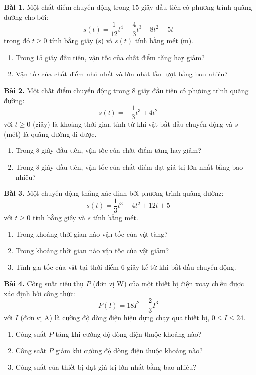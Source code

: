 \documentclass[12pt]{article}
\begin{document}
	\begin{btxanh}
		\textbf{Bài 1.} Một chất điểm chuyển động trong $15$ giây đầu tiên có phương trình quãng đường cho bởi:
		$$s(t) = \dfrac{1}{12}t^4 - \dfrac{4}{3}t^3 + 8t^2 + 5t$$
		trong đó $t \ge 0$ tính bằng giây ($\text{s}$) và $s(t)$ tính bằng mét ($\text{m}$).
		\begin{enumerate}[label=\alph*)]
			\item Trong $15$ giây đầu tiên, vận tốc của chất điểm tăng hay giảm?
			\item Vận tốc của chất điểm nhỏ nhất và lớn nhất lần lượt bằng bao nhiêu?
		\end{enumerate}
		
		\textbf{Bài 2.} Một chất điểm chuyển động trong $8$ giây đầu tiên có phương trình quãng đường:
		$$s(t) = -\dfrac{1}{3}t^3 + 4t^2$$
		với $t \ge 0$ (giây) là khoảng thời gian tính từ khi vật bắt đầu chuyển động và $s$ (mét) là quãng đường đi được.
		\begin{enumerate}[label=\alph*)]
			\item Trong $8$ giây đầu tiên, vận tốc của chất điểm tăng hay giảm?
			\item Trong $8$ giây đầu tiên, vận tốc của chất điểm đạt giá trị lớn nhất bằng bao nhiêu?
		\end{enumerate}
		
		\textbf{Bài 3.} Một chuyển động thẳng xác định bởi phương trình quãng đường:
		$$s(t) = \dfrac{1}{3}t^3 - 4t^2 + 12t + 5$$
		với $t \ge 0$ tính bằng giây và $s$ tính bằng mét.
		\begin{enumerate}[label=\alph*)]
			\item Trong khoảng thời gian nào vận tốc của vật tăng?
			\item Trong khoảng thời gian nào vận tốc của vật giảm?
			\item Tính gia tốc của vật tại thời điểm $6$ giây kể từ khi bắt đầu chuyển động.
		\end{enumerate}
		
		\textbf{Bài 4.} Công suất tiêu thụ $P$ (đơn vị $\text{W}$) của một thiết bị điện xoay chiều được xác định bởi công thức:
		$$P(I) = 18I^2 - \dfrac{2}{3}I^3$$
		với $I$ (đơn vị $\text{A}$) là cường độ dòng điện hiệu dụng chạy qua thiết bị, $0 \le I \le 24$.
		\begin{enumerate}[label=\alph*)]
			\item Công suất $P$ tăng khi cường độ dòng điện thuộc khoảng nào?
			\item Công suất $P$ giảm khi cường độ dòng điện thuộc khoảng nào?
			\item Công suất của thiết bị đạt giá trị lớn nhất bằng bao nhiêu?
		\end{enumerate}
	\end{btxanh}
	
\end{document}
